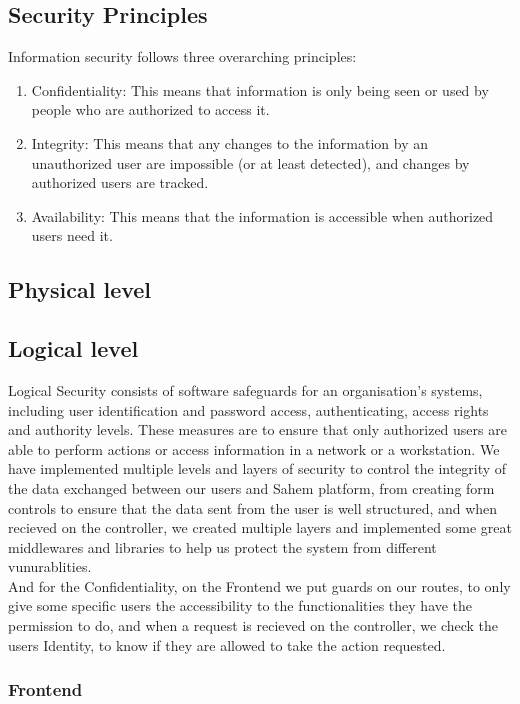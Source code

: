 \subsection{Security Principles}
Information security follows three overarching principles:
\begin{enumerate}
      \item 
      Confidentiality: This means that information is only being seen or used by people who are authorized to access it.
      \item 
      Integrity: This means that any changes to the information by an unauthorized user are impossible (or at least detected), and changes by authorized users are tracked.
      \item 
      Availability: This means that the information is accessible when authorized users need it.
\end{enumerate}

\subsection{Physical level}

\subsection{Logical level}
Logical Security consists of software safeguards for an organisation's systems, including user identification and password access, authenticating, access rights and authority levels. These measures are to ensure that only authorized users are able to perform actions or access information in a network or a workstation.
We have implemented multiple levels and layers of security to control the integrity of the data exchanged between our users and Sahem platform, from creating form controls to ensure that the data sent from the user is well structured, and when recieved on the controller, we created multiple layers and implemented some great middlewares and libraries to help us protect the system from different vunurablities.\\
And for the Confidentiality, on the Frontend we put guards on our routes, to only give some specific users the accessibility to the functionalities they have the permission to do, and when a request is recieved on the controller, we check the users Identity, to know if they are allowed to take the action requested.

\subsubsection{Frontend}
